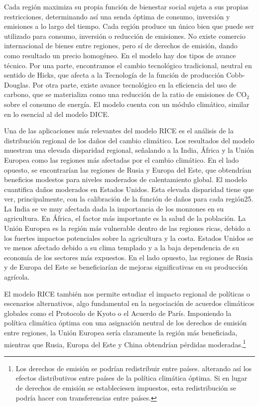\documentclass[10pt,a4paper]{article}
\begin{document}
Cada región maximiza su propia función de bienestar social sujeta a sus propias restricciones, determinando así una senda óptima de consumo, inversión y emisiones a lo largo del tiempo. Cada región produce un único bien que puede ser utilizado para consumo, inversión o reducción de emisiones. No existe comercio internacional de bienes entre regiones, pero sí de derechos de emisión, dando como resultado un precio homogéneo. En el modelo hay dos tipos de avance técnico. Por una parte, encontramos el cambio tecnológico tradicional, neutral en sentido de Hicks, que afecta a la Tecnología de la función de producción Cobb-Douglas. Por otra parte, existe avance tecnológico en la eficiencia del uso de carbono, que se materializa como una reducción de la ratio de emisiones de $\text{CO}_2$ sobre el consumo de energía. El modelo cuenta con un módulo climático, similar en lo esencial al del modelo DICE.

Una de las aplicaciones más relevantes del modelo RICE es el análisis de la distribución regional de los daños del cambio climático. Los resultados del modelo muestran una elevada disparidad regional, señalando a la India, África y la Unión Europea como las regiones más afectadas por el cambio climático. En el lado opuesto, se encontrarían las regiones de Rusia y Europa del Este, que obtendrían beneficios modestos para niveles moderados de calentamiento global. El modelo cuantifica daños moderados en Estados Unidos. Esta elevada disparidad tiene que ver, principalmente, con la calibración de la función de daños para cada región25. La India se ve muy afectada dada la importancia de los monzones en su agricultura. En África, el factor más importante es la salud de la población. La Unión Europea es la región más vulnerable dentro de las regiones ricas, debido a los fuertes impactos potenciales sobre la agricultura y la costa. Estados Unidos se ve menos afectado debido a su clima templado y a la baja dependencia de su economía de los sectores más expuestos. En el lado opuesto, las regiones de Rusia y de Europa del Este se beneficiarían de mejoras significativas en su producción agrícola.

El modelo RICE también nos permite estudiar el impacto regional de políticas o escenarios alternativos, algo fundamental en la negociación de acuerdos climáticos globales como el Protocolo de Kyoto o el Acuerdo de París. Imponiendo la política climática óptima con una asignación neutral de los derechos de emisión entre regiones, la Unión Europea sería claramente la región más beneficiada, mientras que Rusia, Europa del Este y China obtendrían pérdidas moderadas.\footnote{%
    Los derechos de emisión se podrían redistribuir entre países. alterando así los efectos distributivos entre países de la política climática óptima. Si en lugar de derechos de emisión se estableciesen impuestos, esta redistribución se podría hacer con transferencias entre países.
} 
\end{document}
